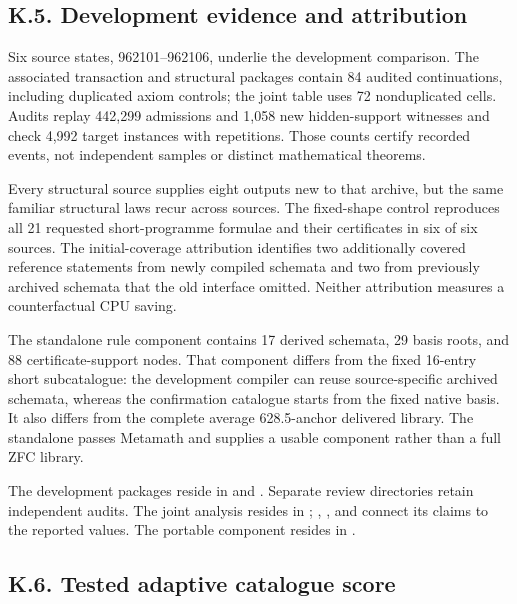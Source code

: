 \documentclass[pdflatex,sn-basic,Numbered]{sn-jnl}
\begin{document}
\subsection*{K.5. Development evidence and attribution}\label{k.5.-development-evidence-and-attribution}

Six source states, 962101--962106, underlie the development comparison. The associated transaction and structural packages contain 84 audited continuations, including duplicated axiom controls; the joint table uses 72 nonduplicated cells. Audits replay 442,299 admissions and 1,058 new hidden-support witnesses and check 4,992 target instances with repetitions. Those counts certify recorded events, not independent samples or distinct mathematical theorems.

Every structural source supplies eight outputs new to that archive, but the same familiar structural laws recur across sources. The fixed-shape control reproduces all 21 requested short-programme formulae and their certificates in six of six sources. The initial-coverage attribution identifies two additionally covered reference statements from newly compiled schemata and two from previously archived schemata that the old interface omitted. Neither attribution measures a counterfactual CPU saving.

The standalone rule component contains 17 derived schemata, 29 basis roots, and 88 certificate-support nodes. That component differs from the fixed 16-entry short subcatalogue: the development compiler can reuse source-specific archived schemata, whereas the confirmation catalogue starts from the fixed native basis. It also differs from the complete average 628.5-anchor delivered library. The standalone  passes Metamath and supplies a usable component rather than a full ZFC library.

The development packages reside in  and . Separate review directories retain independent audits. The joint analysis resides in ; , , and  connect its claims to the reported values. The portable component resides in .

\subsection*{K.6. Tested adaptive catalogue score}\label{k.6.-tested-adaptive-catalogue-score}
\end{document}
